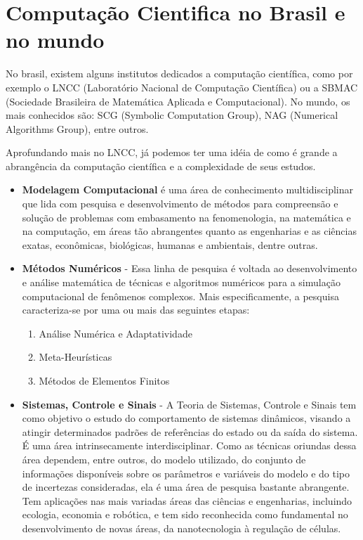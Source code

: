 \section{Computação Cientifica no Brasil e no mundo}

No brasil, existem alguns institutos dedicados a computação científica,
como por exemplo o LNCC (Laboratório Nacional de Computação Científica) ou
a SBMAC (Sociedade Brasileira de Matemática Aplicada e Computacional). No
mundo, os mais conhecidos são: SCG (Symbolic Computation Group), NAG
(Numerical Algorithms Group), entre outros.

Aprofundando mais no LNCC, já podemos ter uma idéia de como é grande a
abrangência da computação científica e a complexidade de seus estudos.

\begin{itemize}

	\item \textbf{Modelagem Computacional} é uma área de
		conhecimento multidisciplinar que lida com pesquisa e
		desenvolvimento de métodos para compreensão e solução de
		problemas com embasamento na fenomenologia, na
		matemática e na computação, em áreas tão abrangentes
		quanto as engenharias e as ciências exatas, econômicas,
		biológicas, humanas e ambientais, dentre outras.

	\item \textbf{Métodos Numéricos} - Essa linha de pesquisa é
		voltada ao desenvolvimento e análise matemática de
		técnicas e algoritmos numéricos para a simulação
		computacional de fenômenos complexos.  Mais
		especificamente, a pesquisa caracteriza-se por uma ou
		mais das seguintes etapas:
		\begin{enumerate}

			\item Análise Numérica e Adaptatividade

			\item Meta-Heurísticas

			\item Métodos de Elementos Finitos

		\end{enumerate}

	\item \textbf{Sistemas, Controle e Sinais} - A Teoria de
		Sistemas, Controle e Sinais tem como objetivo o estudo
		do comportamento de sistemas dinâmicos, visando a
		atingir determinados padrões de referências do estado ou
		da saída do sistema. É uma área intrinsecamente
		interdisciplinar. Como as técnicas oriundas dessa área
		dependem, entre outros, do modelo utilizado, do conjunto
		de informações disponíveis sobre os parâmetros e
		variáveis do modelo e do tipo de incertezas
		consideradas, ela é uma área de pesquisa bastante
		abrangente.  Tem aplicações nas mais variadas áreas das
		ciências e engenharias, incluindo ecologia, economia e
		robótica, e tem sido reconhecida como fundamental no
		desenvolvimento de novas áreas, da nanotecnologia à
		regulação de células.


\end{itemize}
